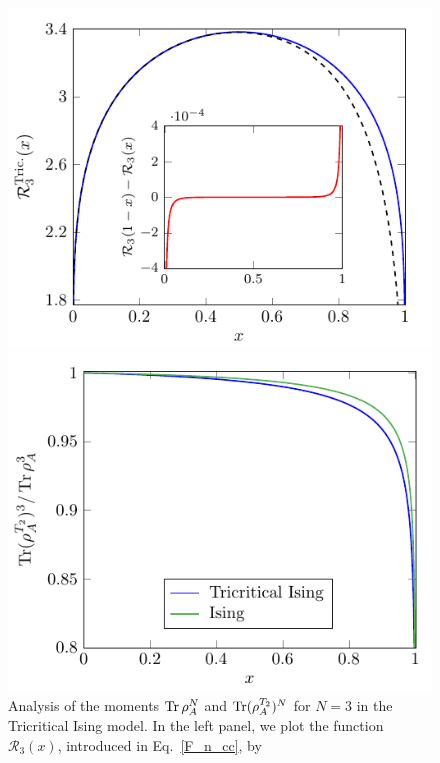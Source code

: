 \documentclass[a4paper,11pt]{article}
\def\Tr{\mathop{\mbox{\normalfont Tr}}\nolimits}
\begin{document}
\begin{figure}[t]
 \begin{minipage}{0.5\linewidth}
 \centering 
 \includegraphics[width=\textwidth]{renyi_entropy_3_tricritical.pdf}
\end{minipage}
 \begin{minipage}{0.5\linewidth}
 \centering 
 \includegraphics[width=\textwidth]{quotient_negativity_entropy_3_tricritical.pdf}
\end{minipage}
\caption{Analysis of the moments $\Tr\rho_A^N$ and $\Tr(\rho_A^{T_2})^N$ for $N=3$ in the Tricritical 
Ising model. In the left panel, we plot the function $\mathcal{R}_3(x)$, introduced in Eq.~\eqref{F_n_cc}, by 
}
\end{figure}
\end{document}

